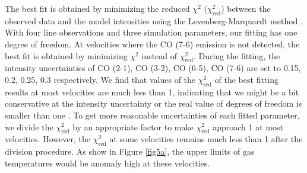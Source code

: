 The best fit is obtained by minimizing the reduced $\chi^2$ ($\chi^2_{\mathrm{red}}$) between the observed data and the model intensities using the Levenberg-Marquardt method \citep{1992nrfa.book.....P}. With four line observations and three simulation parameters, our fitting has one degree of freedom. At velocities where the CO (7-6) emission is not detected, the best fit is obtained by minimizing $\chi^2$ instead of $\chi^2_{\mathrm{red}}$. During the fitting, the intensity uncertainties of CO (2-1), CO (3-2), CO (6-5), CO (7-6) are set to 0.15, 0.2, 0.25, 0.3 respectively.  We find that values of the $\chi^2_{\mathrm{red}}$ of the best fitting results at most velocities are much less than 1, indicating that we might be a bit conservative at the intensity uncertainty or the real value of degrees of freedom is smaller than one \citep{2010arXiv1012.3754A}. To get more reasonable uncertainties of each fitted parameter, we divide the $\chi^2_{\mathrm{red}}$ by an appropriate factor to make $\chi^2_{\mathrm{red}}$ approach 1 at most velocities. However, the $\chi_{\mathrm{red}}^2$ at some velocities remains much less than 1 after the division procedure. As show in Figure \ref{fig5a}, the upper limits of gas temperatures would be anomaly high at these velocities. 

